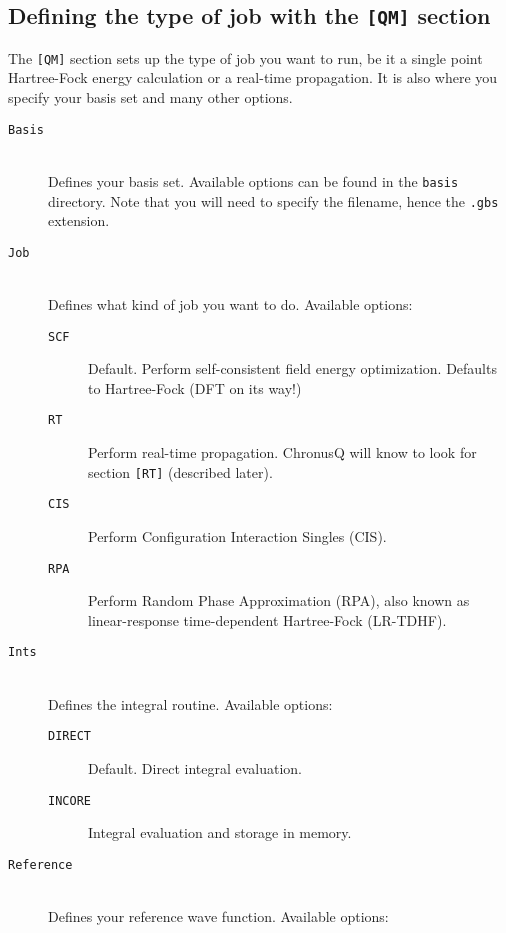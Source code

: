 \documentclass[12pt]{article}
\begin{document}
    \subsection{Defining the type of job with the \texttt{[QM]} section} \label{subsec:QMInput}
    The \texttt{[QM]} section sets up the type of job you want to run, be it a single point Hartree-Fock energy calculation or a real-time propagation. It is also where you specify your basis set and many other options.
    \begin{description}
    \item[\texttt{Basis}] \hfill \\
    Defines your basis set. Available options can be found in the \texttt{basis} directory. Note that you will need to specify the filename, hence the \texttt{.gbs} extension.
    \item[\texttt{Job}] \hfill \\
    Defines what kind of job you want to do. Available options:
      \begin{description}
      \item[\texttt{SCF}] Default. Perform self-consistent field energy optimization. Defaults to Hartree-Fock (DFT on its way!) 
      \item[\texttt{RT}] Perform real-time propagation. ChronusQ will know to look for section \texttt{[RT]} (described later). 
      \item[\texttt{CIS}] Perform Configuration Interaction Singles (CIS). 
      \item[\texttt{RPA}] Perform Random Phase Approximation (RPA), also known as linear-response time-dependent Hartree-Fock (LR-TDHF).
      \end{description}
    \item[\texttt{Ints}] \hfill \\
    Defines the integral routine. Available options: 
      \begin{description}
      \item[\texttt{DIRECT}] Default. Direct integral evaluation.  
      \item[\texttt{INCORE}] Integral evaluation and storage in memory.  
      \end{description}
    \item[\texttt{Reference}] \hfill \\
    Defines your reference wave function. Available options:
      \begin{description}

\end{description}
\end{description}
\end{document}
